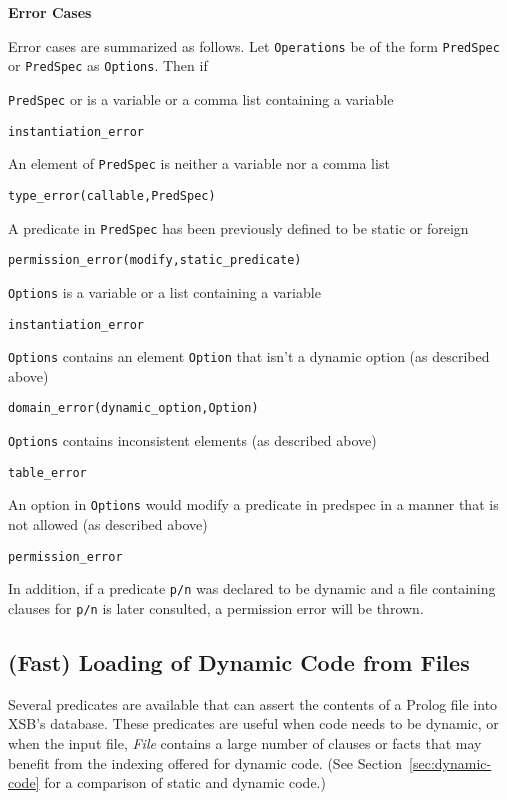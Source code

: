 \begin{description}
{\bf Error Cases} 

Error cases are summarized as follows.  Let {\tt Operations} be of the
form {\tt PredSpec} or {\tt PredSpec} as {\tt Options}.  Then if 
%
\bi
\item {\tt PredSpec} or is a variable or a comma list containing a variable
\bi
\item {\tt instantiation\_error}
\ei
\item An element of {\tt PredSpec} is neither a variable nor a comma
  list
\bi
\item 	{\tt type\_error(callable,PredSpec)}
\ei
\item 	A predicate in {\tt PredSpec} has been previously defined to be static or foreign
\bi
\item 	{\tt permission\_error(modify,static\_predicate)}
\ei
\item {\tt Options} is a variable or a list containing a variable
\bi
\item {\tt instantiation\_error}
\ei
\item {\tt Options} contains an element {\tt Option} that isn't a dynamic option (as described above)
\bi
\item {\tt domain\_error(dynamic\_option,Option)}
\ei
\item {\tt Options} contains inconsistent elements (as described above)
\bi
\item {\tt table\_error}
\ei
\item An option in {\tt Options} would modify a predicate in predspec
  in a manner that is not allowed (as described above)
\bi
\item {\tt permission\_error}
\ei
\ei

In addition, if a predicate {\tt p/n} was declared to be dynamic and a
file containing clauses for {\tt p/n} is later consulted, a permission
error will be thrown.

\end{description}

\subsection{(Fast) Loading of Dynamic Code from Files} \label{sec:LoadDyn}

Several predicates are available that can assert the contents of a
Prolog file into XSB's database.  These predicates are useful when
code needs to be dynamic, or when the input file, {\em File} contains
a large number of clauses or facts that may benefit from the indexing
offered for dynamic code.  (See Section~\ref{sec:dynamic-code} for a
comparison of static and dynamic code.)

